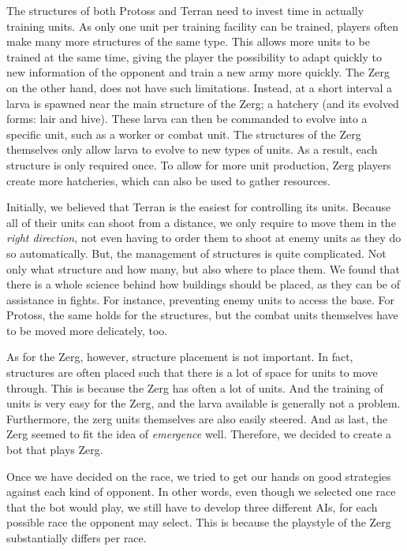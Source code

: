 The structures of both Protoss and Terran need to invest time in actually training units. As only one unit per training facility can be trained, players often make many more structures of the same type. This allows more units to be trained at the same time, giving the player the possibility to adapt quickly to new information of the opponent and train a new army more quickly. The Zerg on the other hand, does not have such limitations. Instead, at a short interval a larva is spawned near the main structure of the Zerg; a hatchery (and its evolved forms: lair and hive). These larva can then be commanded to evolve into a specific unit, such as a worker or combat unit. The structures of the Zerg themselves only allow larva to evolve to new types of units. As a result, each structure is only required once. To allow for more unit production, Zerg players create more hatcheries, which can also be used to gather resources.

Initially, we believed that Terran is the easiest for controlling its units. Because all of their units can shoot from a distance, we only require to move them in the \emph{right direction}, not even having to order them to shoot at enemy units as they do so automatically. But, the management of structures is quite complicated. Not only what structure and how many, but also where to place them. We found that there is a whole science behind how buildings should be placed, as they can be of assistance in fights. For instance, preventing enemy units to access the base. For Protoss, the same holds for the structures, but the combat units themselves have to be moved more delicately, too. 

As for the Zerg, however, structure placement is not important. In fact, structures are often placed such that there is a lot of space for units to move through. This is because the Zerg has often a lot of units. And the training of units is very easy for the Zerg, and the larva available is generally not a problem. Furthermore, the zerg units themselves are also easily steered. And as last, the Zerg seemed to fit the idea of \emph{emergence} well. Therefore, we decided to create a bot that plays Zerg.

Once we have decided on the race, we tried to get our hands on good strategies against each kind of opponent. In other words, even though we selected one race that the bot would play, we still have to develop three different AIs, for each possible race the opponent may select. This is because the playstyle of the Zerg substantially differs per race.

